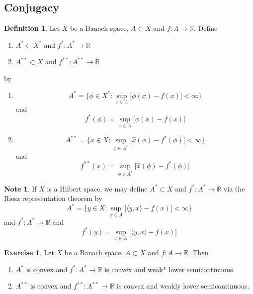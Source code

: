 \documentclass[12pt]{amsart}
\theoremstyle{definition}
\newtheorem{defn}[definition]{Definition}
\newtheorem{note}[definition]{Note}
\newtheorem{ex}[definition]{Exercise}
\newcommand{\R}{\mathbb{R}}
\renewcommand{\r}{\rangle}
\renewcommand{\l}{\langle}
\DeclareMathOperator*{\0}{\mbf{0}}
\DeclareMathOperator*{\1}{\mbf{1}}
\newcommand{\lex}[1]{\label{ex:#1}}
\newcommand{\ld}[1]{\label{defn:#1}}
\begin{document}
	\newpage 
	\subsection{Conjugacy}
	
	\begin{defn} \ld{}
	Let $X$ be a Banach space, $A \subset X$ and $f:A \rightarrow \R$. Define 
	\begin{enumerate}
		\item $A^* \subset X^*$ and $f^*: A^* \rightarrow \R$ 
		\item $A^{**} \subset X$ and $f^{**}:A^{**} \rightarrow \R$
	\end{enumerate}
	by 
	\begin{enumerate}
		\item $$A^* = \bigg \{\phi \in X^*: \sup_{x \in A} \bigg[ \phi(x) - f(x) \bigg] < \infty \bigg  \}$$ and $$f^*(\phi) = \sup_{x \in A} \bigg[ \phi(x) - f(x) \bigg] $$  
		\item $$A^{**} = \bigg \{x \in X: \sup_{\phi \in A^*} \bigg[ \hat{x}(\phi) - f^*(\phi) \bigg] < \infty \bigg \}$$ and $$f^{**}(x) = \sup_{\phi \in A^*} \bigg[ \hat{x}(\phi) - f^*(\phi) \bigg]$$
	\end{enumerate}
	\end{defn} 

	\begin{note}
		If $X$ is a Hilbert space, we may define $A^* \subset X$ and $f^*: A^* \rightarrow \R$ via the Riesz representation theorem by $$A^* = \bigg \{y \in X: \sup_{x \in A} \bigg[ \l y, x \r - f(x) \bigg] < \infty \bigg  \}$$ and $f^*: A^* \rightarrow \R$ and $$ f^*(y) = \sup_{x \in A} \bigg[ \l y, x \r - f(x) \bigg] $$
	\end{note}
	
	\begin{ex} \lex{}
	Let $X$ be a Banach space, $A \subset X$ and $f:A \rightarrow \R$. Then 
	\begin{enumerate}
		\item $A^*$ is convex and $f^*:A^* \rightarrow \R$ is convex and weak* lower semicontinuous.
		\item $A^{**}$ is convex and $f^{**}:A^{**} \rightarrow \R$ is convex and weakly lower semicontinuous.
	\end{enumerate} 
	\end{ex}
	
\end{document}
